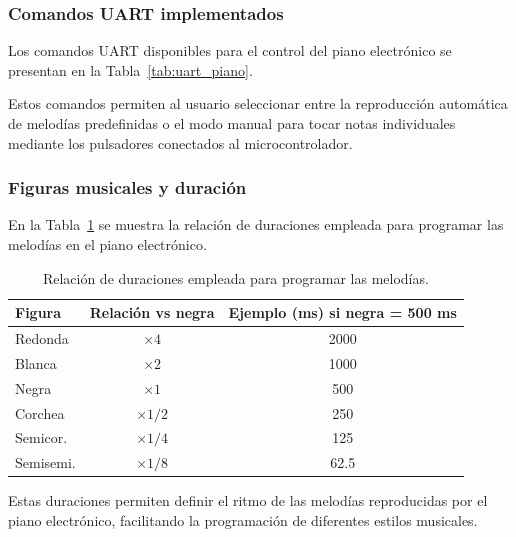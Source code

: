 \subsubsection{Comandos UART implementados}

Los comandos UART disponibles para el control del piano electrónico se presentan en la Tabla~\ref{tab:uart_piano}. 

\begin{table}[H]
\centering
{}
\caption{Comandos UART disponibles para el control del piano electrónico.}
\label{tab:uart_piano}
\end{table}

Estos comandos permiten al usuario seleccionar entre la reproducción automática de melodías predefinidas o el modo manual para tocar notas individuales mediante los pulsadores conectados al microcontrolador.

\vspace{0.5cm}

\subsubsection{Figuras musicales y duración}

En la Tabla~\ref{tab:figuras_piano} se muestra la relación de duraciones empleada para programar las melodías en el piano electrónico.

\begin{table}[H]
\centering
\begin{tabular}{|l|c|c|}
\hline
\textbf{Figura} & \textbf{Relación vs negra} & \textbf{Ejemplo (ms) si negra = 500 ms} \\
\hline
Redonda  & $\times 4$   & 2000 \\
Blanca   & $\times 2$   & 1000 \\
Negra    & $\times 1$   & 500 \\
Corchea  & $\times 1/2$ & 250 \\
Semicor. & $\times 1/4$ & 125 \\
Semisemi. & $\times 1/8$ & 62.5 \\
\hline
\end{tabular}
\caption{Relación de duraciones empleada para programar las melodías.}
\label{tab:figuras_piano}
\end{table}

Estas duraciones permiten definir el ritmo de las melodías reproducidas por el piano electrónico, facilitando la programación de diferentes estilos musicales.